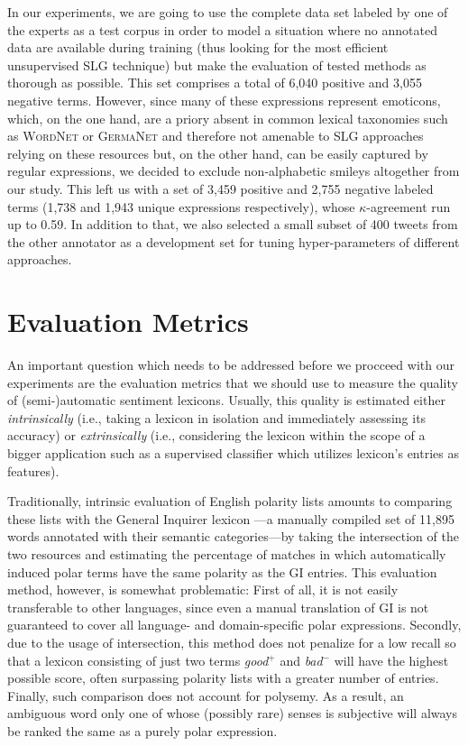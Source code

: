 In our experiments, we are going to use the complete data set labeled
by one of the experts as a test corpus in order to model a situation
where no annotated data are available during training (thus looking
for the most efficient unsupervised SLG technique) but make the
evaluation of tested methods as thorough as possible.  This set
comprises a total of 6,040 positive and 3,055 negative terms.
However, since many of these expressions represent emoticons, which,
on the one hand, are a priory absent in common lexical taxonomies such
as \textsc{WordNet} \cite{Miller:95,Miller:07} or \textsc{GermaNet}
\cite{Hamp:97} and therefore not amenable to SLG approaches relying on
these resources but, on the other hand, can be easily captured by
regular expressions, we decided to exclude non-alphabetic smileys
altogether from our study.  This left us with a set of 3,459 positive
and 2,755 negative labeled terms (1,738 and 1,943 unique expressions
respectively), whose $\kappa$-agreement run up to 0.59.  In addition
to that, we also selected a small subset of 400 tweets from the other
annotator as a development set for tuning hyper-parameters of
different approaches.

\section{Evaluation Metrics}\label{subsec:snt-lex:eval-metrics}

An important question which needs to be addressed before we procceed
with our experiments are the evaluation metrics that we should use to
measure the quality of (semi-)automatic sentiment lexicons.  Usually,
this quality is estimated either \textit{intrinsically} (i.e., taking
a lexicon in isolation and immediately assessing its accuracy) or
\textit{extrinsically} (i.e., considering the lexicon within the scope
of a bigger application such as a supervised classifier which utilizes
lexicon's entries as features).

Traditionally, intrinsic evaluation of English polarity lists amounts
to comparing these lists with the General Inquirer lexicon \cite[GI;
][]{Stone:66}---a manually compiled set of 11,895 words annotated with
their semantic categories---by taking the intersection of the two
resources and estimating the percentage of matches in which
automatically induced polar terms have the same polarity as the GI
entries.  This evaluation method, however, is somewhat problematic:
First of all, it is not easily transferable to other languages, since
even a manual translation of GI is not guaranteed to cover all
language- and domain-specific polar expressions.  Secondly, due to the
usage of intersection, this method does not penalize for a low recall
so that a lexicon consisting of just two terms \textit{good}$^+$ and
\textit{bad}$^-$ will have the highest possible score, often
surpassing polarity lists with a greater number of entries.  Finally,
such comparison does not account for polysemy.  As a result, an
ambiguous word only one of whose (possibly rare) senses is subjective
will always be ranked the same as a purely polar expression.

